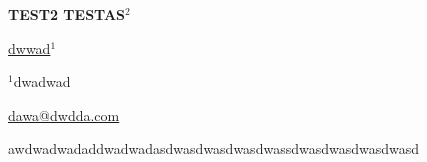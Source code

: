 \documentclass[12pt, twoside, a4paper, hidelinks]{article}
\begin{document}
        \begin{center} \MakeUppercase{ {\large \textbf{Test2 Testas$^{2}$}}} \end{center}
        \vspace{-0.8cm}\begin{center} \underline{dwwad}$^{1}$ \end{center}
        \vspace{-.5cm}

        \begin{center} {\small $^{1}$dwadwad
            
            \underline{dawa@dwdda.com}
        } \end{center}

        awdwadwadaddwadwadasdwasdwasdwasdwassdwasdwasdwasdwasd
        
\end{document}
